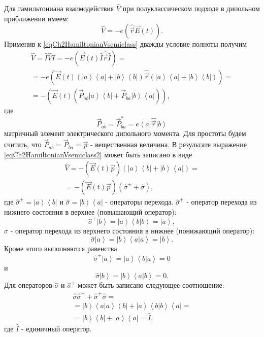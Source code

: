 Для гамильтониана взаимодействия $\hat{V}$ при полуклассическом
подходе в дипольном приближении имеем:
\begin{equation}
\hat{V} = - e \left(\hat{\vec{r}} \vec{E}\left(t\right)\right).
\label{eqCh2HamiltonianVsemiclass}
\end{equation}
Применив к \eqref{eqCh2HamiltonianVsemiclass} дважды условие
полноты получим
\begin{eqnarray}
\hat{V} = \hat{I}\hat{V}\hat{I} = - e \left(\vec{E}\left(t\right)
\hat{I}\hat{\vec{r}}\hat{I}\right) = 
\nonumber \\
= - e \left(\vec{E}\left(t\right) 
\left(\left|a\right>\left<a\right| +
  \left|b\right>\left<b\right|\right)\hat{\vec{r}}
\left(\left|a\right>\left<a\right| +
  \left|b\right>\left<b\right|\right)\right) = 
\nonumber \\
= - \left(\vec{E}\left(t\right)
  \left(\vec{P}_{ab}\left|a\right>\left<b\right| +
    \vec{P}_{ba}\left|b\right>\left<a\right|\right)\right),
\label{eqCh2HamiltonianVsemiclass2}
\end{eqnarray}
где 
\[
\vec{P}_{ab} = \vec{P}_{ba}^{*} = e \left<a\right|\hat{\vec{r}}\left|b\right>
\]
матричный элемент электрического дипольного момента. 
Для простоты будем считать, что $\vec{P}_{ab} = \vec{P}_{ba} =
\vec{p}$ - вещественная величина. В результате выражение
\eqref{eqCh2HamiltonianVsemiclass2} может быть записано в виде
\begin{eqnarray}
\hat{V} 
= - \left(\vec{E}\left(t\right)\vec{p}\right)
\left(
  \left|a\right>\left<b\right| +
  \left|b\right>\left<a\right|\right) = 
\nonumber \\
= - \left(\vec{E}\left(t\right)\vec{p}\right) \left(\hat{\sigma}^{+} + \hat{\sigma}\right),
\label{eqCh2HamiltonianVsemiclass3}
\end{eqnarray}
где  $\hat{\sigma}^{+} = \left|a\right>\left<b\right|$ и 
$\hat{\sigma} = \left|b\right>\left<a\right|$ 
-  операторы перехода. 
$\hat{\sigma}^{+}$ -  оператор перехода из нижнего состояния в верхнее (повышающий
оператор):
\[
\hat{\sigma}^{+} \left|b\right> = 
\left|a\right>\left<b\right|\left.b\right> = 
\left|a\right>,
\]
$\hat{\sigma}$
- оператор перехода из верхнего состояния в нижнее
(понижающий оператор):
\[
\hat{\sigma}
\left|a\right> = 
\left|b\right>\left<a\right|\left.a\right> = 
\left|b\right>.
\]
Кроме этого выполняются равенства
\[
\hat{\sigma}^{+} \left|a\right> = 
\left|a\right>\left<b\right|\left.a\right> = 
0
\]
и
\[
\hat{\sigma}
\left|b\right> = 
\left|b\right>\left<a\right|\left.b\right> = 
0.
\]
Для операторов $\hat{\sigma}$ и $\hat{\sigma}^{+}$ может быть записано
следующее соотношение: 
\begin{eqnarray}
\hat{\sigma}\hat{\sigma}^{+} + \hat{\sigma}^{+}\hat{\sigma} =
\nonumber \\
= \left|b\right>\left<a\right|\left.a\right>\left<b\right| + 
 \left|a\right>\left<b\right|\left.b\right>\left<a\right| = 
\nonumber \\
= \left|b\right>\left<b\right| + \left|a\right>\left<a\right| = \hat{I}, 
\label{eqCh2_task1}
\end{eqnarray}
где $\hat{I}$ - единичный оператор.

